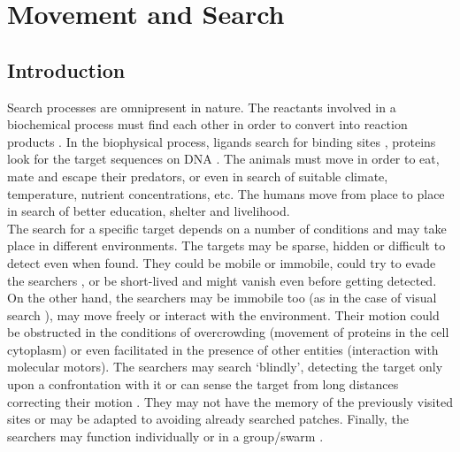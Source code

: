 \documentclass[12pt]{report}
\begin{document}
\begin{justify}
\newpage
\thispagestyle{empty}
\begin{center}

\end{center}
\newpage


\tableofcontents


\newpage
\thispagestyle{empty}
\begin{center}

\end{center}

\newpage
{}
\setcounter{page}{1}

\chapter{Movement and Search}

\section{Introduction}
Search processes are omnipresent in nature. The reactants involved in a biochemical process must find each other in order to convert into reaction products \cite{chemkin}. In the biophysical process, ligands search for binding sites \cite{bindsite}, proteins look for the target sequences on DNA \cite{DNA}. The animals must move in order to eat, mate and escape their predators, or even in search of suitable climate, temperature, nutrient concentrations, etc. The humans move from place to place in search of better education, shelter and livelihood.\\

The search for a specific target depends on a number of conditions and may take place in different environments. The targets may be sparse, hidden or difficult to detect even when found. They could be mobile or immobile, could try to evade the searchers \cite{evade, groupchase}, or be short-lived and might vanish even before getting detected. On the other hand, the searchers may be immobile too (as in the case of visual search \cite{visualsearch}), may move freely or interact with the environment. Their motion could be obstructed in the conditions of overcrowding \cite{overcrowding} (movement of proteins in the cell cytoplasm) or even facilitated in the presence of other entities (interaction with molecular motors). The searchers may search `blindly', detecting the target only upon a confrontation with it or can sense the target from long distances correcting their motion \cite{evade,chemotaxis}. They may not have the memory of the previously visited sites or may be adapted to avoiding already searched patches. Finally, the searchers may function individually or in a group/swarm \cite{chasing, unknownEnv}.\\



\end{justify}
\end{document}
